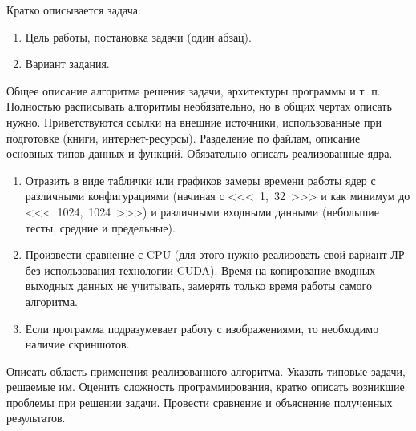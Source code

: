 \documentclass[12pt]{article}
\begin{document}


Кратко описывается задача:
\begin{enumerate}
	\item Цель работы, постановка задачи (один абзац).
	\item Вариант задания.
\end{enumerate}

\nvidia

Общее описание алгоритма решения задачи, архитектуры программы и т. п.
Полностью расписывать алгоритмы необязательно, но в общих чертах описать нужно.
Приветствуются ссылки на внешние источники, использованные при подготовке
(книги, интернет-ресурсы).
Разделение по файлам, описание основных типов данных и функций. Обязательно
описать реализованные ядра.

\begin{enumerate}
	\item Отразить в виде таблички или графиков замеры времени работы ядер с
	      различными конфигурациями (начиная с <<< 1, 32 >>> и как минимум до
	      <<< 1024, 1024 >>>) и различными входными данными (небольшие тесты,
	      средние и предельные).

	\item Произвести сравнение с CPU (для этого нужно реализовать свой вариант ЛР без
	      использования технологии CUDA). Время на копирование входных-выходных
	      данных не учитывать, замерять только время работы самого алгоритма.

	\item Если программа подразумевает работу с изображениями, то необходимо
	      наличие скриншотов.
\end{enumerate}



Описать область применения реализованного алгоритма. Указать типовые задачи,
решаемые им. Оценить сложность программирования, кратко описать возникшие
проблемы при решении задачи. Провести сравнение и объяснение полученных
результатов.
\end{document}

